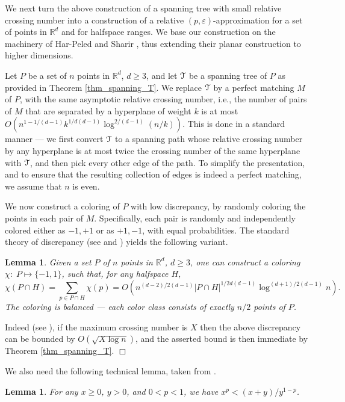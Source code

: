 \documentclass[11pt]{article}
\newtheorem{lemma}[theorem]{Lemma}
\newcommand{\Tree}{\EuScript{T}}
\def\reals{\mathbb R}
\def\peps{(p,\varepsilon)}
\begin{document}
We next turn the above construction of a spanning tree with small relative crossing number into a construction of a relative $\peps$-approximation for a set of points in $\reals^{d}$ and for halfspace ranges. We base our construction on the machinery of Har-Peled and Sharir \cite{hs11}, thus extending their planar construction to higher dimensions.

Let $P$ be a set of $n$ points in $\reals^{d}$, $d \geq 3$, and let $\Tree$ be a spanning tree of $P$ as provided in Theorem \ref{thm_spanning_T}. We replace $\Tree$ by a perfect matching $M$ of $P$, with the same asymptotic relative crossing number, i.e., the number of pairs of $M$ that are separated by a hyperplane of weight $k$ is at most $O\left(n^{1-1/(d-1)} k^{1/d(d-1)} \log^{2/(d-1)}(n/k)\right)$. This is done in a standard manner --- we first convert $\Tree$ to a spanning path whose relative crossing number by any hyperplane is at most twice the crossing number of the same hyperplane with $\Tree$, and then pick every other edge of the path. To simplify the presentation, and to ensure that the resulting collection of edges is indeed a perfect matching, we assume that $n$ is even.

We now construct a coloring of $P$ with low discrepancy, by randomly coloring the points in each pair of $M$. Specifically, each pair is randomly and independently colored either as $-1,+1$ or as $+1,-1$, with equal probabilities. The standard theory of discrepancy (see \cite{cha01} and \cite{mat99}) yields the following variant.

\begin{lemma} \label{lemma_discrepancy}
Given a set $P$ of $n$ points in $\reals^{d}$, $d \geq 3$, one can construct a coloring $\chi:\;P\mapsto \{-1,1\}$, such that, for any halfspace $H$,
$$
\chi(P \cap H) = \sum_{p \in P \cap H}\chi(p) = O\left(n^{(d-2)/2(d-1)} |P \cap H|^{1/2d(d-1)} \log^{(d+1)/2(d-1)}n \right).
$$
The coloring is balanced --- each color class consists of exactly $n/2$ points of $P$.
\end{lemma}

 Indeed (see \cite{cha01, mat99}), if the maximum crossing number is $X$ then the above discrepancy can be bounded by $O(\sqrt{X\log n})$, and the asserted bound is then immediate by Theorem \ref{thm_spanning_T}. $\Box$

We also need the following technical lemma, taken from \cite{hs11}.
\begin{lemma} \label{lemma_approx_technical}
For any $x \geq 0$, $y > 0$, and $0 < p < 1$, we have $x^{p} < (x+y)/y^{1-p}$.
\end{lemma}
\end{document}
